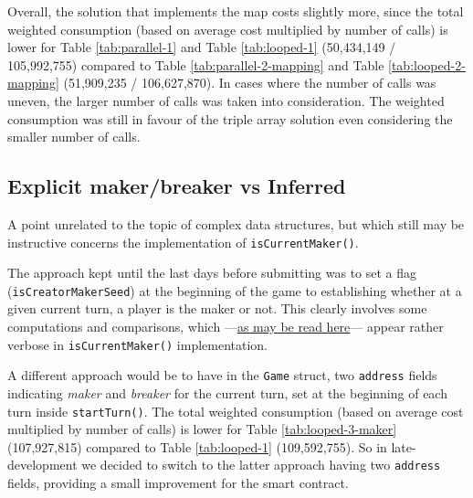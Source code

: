 Overall, the solution that implements the map costs slightly more, since the total weighted consumption (based on average cost multiplied by number of calls) is lower for Table \ref{tab:parallel-1} and Table \ref{tab:looped-1} (50,434,149 / 105,992,755) compared to Table \ref{tab:parallel-2-mapping} and Table \ref{tab:looped-2-mapping} (51,909,235 / 106,627,870). In cases where the number of calls was uneven, the larger number of calls was taken into consideration. The weighted consumption was still in favour of the triple array solution even considering the smaller number of calls.

\subsection{Explicit maker/breaker vs Inferred}

A point unrelated to the topic of complex data structures, but which still may be instructive concerns the implementation of \texttt{isCurrentMaker()}.

The approach kept until the last days before submitting was to set a flag (\texttt{isCreatorMakerSeed}) at the beginning of the game to establishing whether at a given current turn, a player is the maker or not.
This clearly involves some computations and comparisons, which ---\href{https://github.com/frenzis01/mastermind/blob/7009a1c3edf85180f41b1e106b04d0352f268993/contracts/Mastermind.sol#L699}{as may be read here}--- appear rather verbose in \texttt{isCurrentMaker()} implementation.

A different approach would be to have in the \texttt{Game} struct, two \lstinline{address} fields indicating  \textit{maker} and \textit{breaker} for the current turn, set at the beginning of each turn inside \lstinline{startTurn()}.
The total weighted consumption (based on average cost multiplied by number of calls) is lower for Table \ref{tab:looped-3-maker} (107,927,815) compared to Table \ref{tab:looped-1} (109,592,755).
So in late-development we decided to switch to the latter approach having two \lstinline{address} fields, providing a small improvement for the smart contract.



